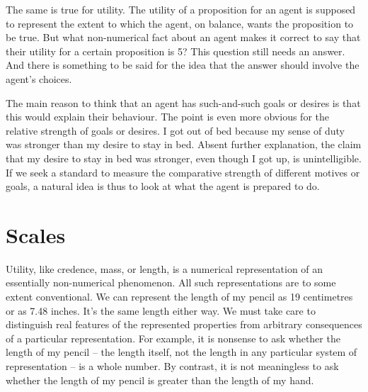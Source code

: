 The same is true for utility. The utility of a proposition for an agent is
supposed to represent the extent to which the agent, on balance, wants the
proposition to be true. But what non-numerical fact about an agent makes it
correct to say that their utility for a certain proposition is 5? This question
still needs an answer. And there is something to be said for the idea that the
answer should involve the agent's choices.


The main reason to think that an agent has such-and-such goals or desires is
that this would explain their behaviour. The point is even more obvious for the
relative strength of goals or desires. I got out of bed because my sense of duty
was stronger than my desire to stay in bed. Absent further explanation, the
claim that my desire to stay in bed was stronger, even though I got up, is
unintelligible. If we seek a standard to measure the comparative strength of
different motives or goals, a natural idea is thus to look at what the agent is
prepared to do.

\section{Scales}

Utility, like credence, mass, or length, is a numerical representation of an
essentially non-numerical phenomenon. All such representations are to some
extent conventional. We can represent the length of my pencil as 19 centimetres
or as 7.48 inches. It's the same length either way. We must take care to
distinguish real features of the represented properties from arbitrary
consequences of a particular representation. For example, it is nonsense to ask
whether the length of my pencil -- the length itself, not the length in any
particular system of representation -- is a whole number. By contrast, it is not
meaningless to ask whether the length of my pencil is greater than the length of
my hand.

